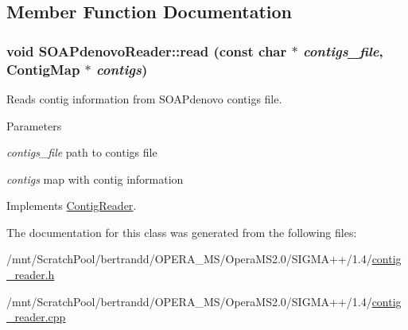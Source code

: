 \subsection{Member Function Documentation}
\hypertarget{classSOAPdenovoReader_a308a9eb5c0b557c98705eaa4bd6626f7}{
\subsubsection[{read}]{\setlength{\rightskip}{0pt plus 5cm}void SOAPdenovoReader::read (const char $\ast$ {\em contigs\_\-file}, \/  {\bf ContigMap} $\ast$ {\em contigs})}}
\label{classSOAPdenovoReader_a308a9eb5c0b557c98705eaa4bd6626f7}


Reads contig information from SOAPdenovo contigs file. 
\begin{DoxyParams}{Parameters}
\item[{\em contigs\_\-file}]path to contigs file \item[{\em contigs}]map with contig information \end{DoxyParams}
 

Implements \hyperlink{classContigReader_a935b5918388b7009b36e639391cfa4e8}{ContigReader}.

The documentation for this class was generated from the following files:\begin{DoxyCompactItemize}
\item 
/mnt/ScratchPool/bertrandd/OPERA\_\-MS/OperaMS2.0/SIGMA++/1.4/\hyperlink{contig__reader_8h}{contig\_\-reader.h}\item 
/mnt/ScratchPool/bertrandd/OPERA\_\-MS/OperaMS2.0/SIGMA++/1.4/\hyperlink{contig__reader_8cpp}{contig\_\-reader.cpp}\end{DoxyCompactItemize}
